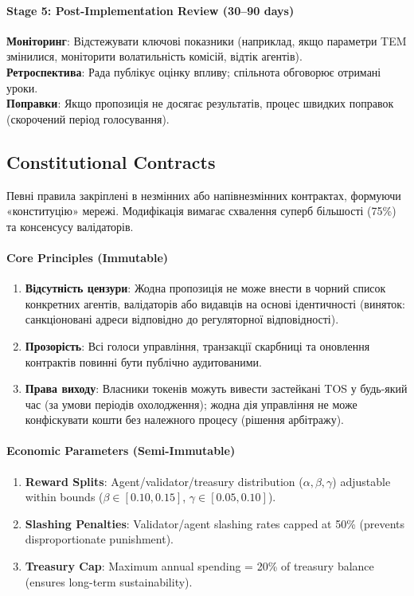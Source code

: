 \documentclass[11pt]{article}
\begin{document}
\paragraph{Stage 5: Post-Implementation Review (30--90 days)}
\textbf{Моніторинг}: Відстежувати ключові показники (наприклад, якщо параметри TEM змінилися, моніторити волатильність комісій, відтік агентів).\\
\textbf{Ретроспектива}: Рада публікує оцінку впливу; спільнота обговорює отримані уроки.\\
\textbf{Поправки}: Якщо пропозиція не досягає результатів, процес швидких поправок (скорочений період голосування).

\subsection{Constitutional Contracts}

Певні правила закріплені в незмінних або напівнезмінних контрактах, формуючи «конституцію» мережі. Модифікація вимагає схвалення суперб більшості (75\%) та консенсусу валідаторів.

\paragraph{Core Principles (Immutable)}
\begin{enumerate}[noitemsep]
  \item \textbf{Відсутність цензури}: Жодна пропозиція не може внести в чорний список конкретних агентів, валідаторів або видавців на основі ідентичності (виняток: санкціоновані адреси відповідно до регуляторної відповідності).
  \item \textbf{Прозорість}: Всі голоси управління, транзакції скарбниці та оновлення контрактів повинні бути публічно аудитованими.
  \item \textbf{Права виходу}: Власники токенів можуть вивести застейкані TOS у будь-який час (за умови періодів охолодження); жодна дія управління не може конфіскувати кошти без належного процесу (рішення арбітражу).
\end{enumerate}

\paragraph{Economic Parameters (Semi-Immutable)}
\begin{enumerate}[noitemsep]
  \item \textbf{Reward Splits}: Agent/validator/treasury distribution ($\alpha, \beta, \gamma$) adjustable within bounds ($\beta \in [0.10, 0.15]$, $\gamma \in [0.05, 0.10]$).
  \item \textbf{Slashing Penalties}: Validator/agent slashing rates capped at 50\% (prevents disproportionate punishment).
  \item \textbf{Treasury Cap}: Maximum annual spending = 20\% of treasury balance (ensures long-term sustainability).
\end{enumerate}
\end{document}
